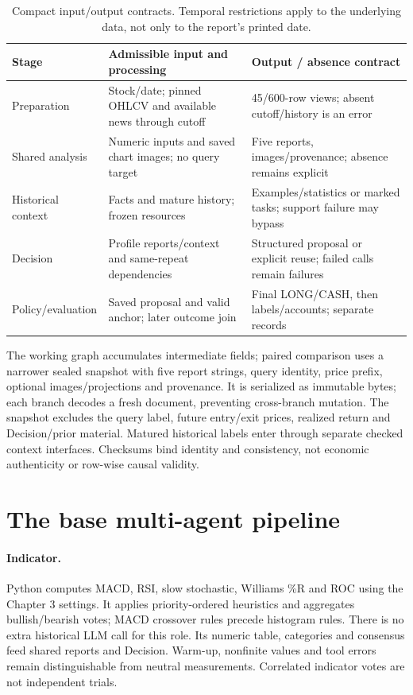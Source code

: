 \begin{table}[htbp]\centering\small{}
\caption[Component input/output contracts]{Compact input/output contracts. Temporal restrictions apply to
the underlying data, not only to the report's printed date.}\label{tab:contracts}
\begin{tabular}{@{}P{.20\linewidth}P{.38\linewidth}P{.35\linewidth}@{}}\toprule
Stage & Admissible input and processing & Output / absence contract\\\midrule
Preparation & Stock/date; pinned OHLCV and available news through cutoff & 45/600-row views; absent cutoff/history is an error\\
Shared analysis & Numeric inputs and saved chart images; no query target & Five reports, images/provenance; absence remains explicit\\
Historical context & Facts and mature history; frozen resources & Examples/statistics or marked tasks; support failure may bypass\\
Decision & Profile reports/context and same-repeat dependencies & Structured proposal or explicit reuse; failed calls remain failures\\
Policy/evaluation & Saved proposal and valid anchor; later outcome join & Final LONG/CASH, then labels/accounts; separate records\\\bottomrule
\end{tabular}\end{table}

The working graph accumulates intermediate fields; paired comparison uses
a narrower sealed snapshot with five report strings, query identity,
price prefix, optional images/projections and provenance. It is serialized
as immutable bytes; each branch decodes a fresh document, preventing
cross-branch mutation. The snapshot excludes the query label, future
entry/exit prices, realized return and Decision/prior material. Matured
historical labels enter through separate checked context interfaces.
Checksums bind identity and consistency, not economic authenticity or
row-wise causal validity.

\section{The base multi-agent pipeline}\label{s:b15ca1cf7b81c6ca}
\paragraph{Indicator.}
Python computes MACD, RSI, slow stochastic, Williams \%R and ROC using
the Chapter 3 settings. It applies priority-ordered heuristics and
aggregates bullish/bearish votes; MACD crossover rules precede histogram
rules. There is no extra historical LLM call for this role. Its numeric
table, categories and consensus feed shared reports and Decision. Warm-up,
nonfinite values and tool errors remain distinguishable from neutral
measurements. Correlated indicator votes are not independent trials.

